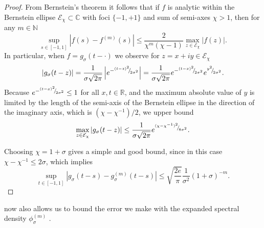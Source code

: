 \documentclass[12pt]{article}
\begin{document}
\begin{proof}
    From Bernstein's theorem \cite[theorem 4.3]{trefethen-2008-gauss-quadrature} it follows that if $f$ is analytic within the Bernstein ellipse $\mathcal{E}_{\chi} \subset \mathbb{C}$ with foci $\{-1, +1\}$ and sum of semi-axes $\chi > 1$, then for any $m \in \mathbb{N}$
    \begin{equation}
        \sup_{s \in [-1, 1]} \left| f(s) - f^{(m)}(s) \right| \leq \frac{2}{\chi^m (\chi - 1)} \max_{z \in \mathcal{E}_{\chi}} |f(z)|.
        \label{equ:bernstein-bound}
    \end{equation}
    In particular, when $f = g_{\sigma}(t - \cdot)$ we observe for $z = x + iy \in \mathcal{E}_{\chi}$
    \begin{equation}
    | g_{\sigma}(t - z) | 
    = \frac{1}{\sigma \sqrt{2 \pi}} \left| e^{-{}^{(t - z)^2}{\mskip -5mu/\mskip -3mu}_{2\sigma^2}} \right|
    = \frac{1}{\sigma \sqrt{2 \pi}} e^{-{}^{(t - x)^2}{\mskip -5mu/\mskip -3mu}_{2\sigma^2}}e^{{}^{y^2}{\mskip -5mu/\mskip -3mu}_{2\sigma^2}}.
    \end{equation}
    Because $e^{-{}^{(t - x)^2}{\mskip -5mu/\mskip -3mu}_{2\sigma^2}} \leq 1$ for all $x, t \in \mathbb{R}$, and the maximum absolute value of $y$ is limited by the length of the semi-axis of the Bernstein ellipse in the direction of the imaginary axis, which is $(\chi - \chi^{-1}) / 2$, we upper bound
    \begin{equation}
        \max_{z \in \mathcal{E}_{\chi}} | g_{\sigma}(t - z) | 
        \leq \frac{1}{\sigma \sqrt{2 \pi}} e^{{}^{(\chi - \chi^{-1})^2}{\mskip -5mu/\mskip -3mu}_{8 \sigma^2}}.
    \end{equation}

    Choosing $\chi = 1 + \sigma$ gives a simple and good bound, since in this case $\chi - \chi^{-1} \leq 2\sigma$, which implies
    \begin{equation}
        \sup_{t \in [-1, 1]} \left| g_{\sigma}(t - s) - g_{\sigma}^{(m)}(t - s) \right| \leq \sqrt{\frac{2e}{\pi}} \frac{1}{\sigma^2} (1 + \sigma)^{-m}.
    \end{equation}
\end{proof}

 now also allows us to bound the error we make with the expanded spectral density $\phi_{\sigma}^{(m)}$ .
\end{document}
